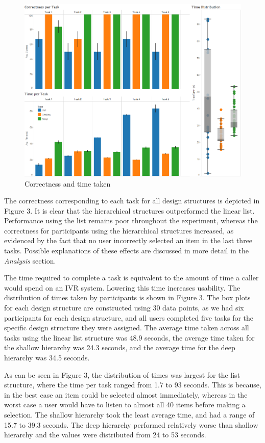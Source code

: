 \documentclass{sigchi}
\begin{document}
\begin{figure}[!h]
    \centering
    \includegraphics[width=0.9\columnwidth]{fig_CorrectnessAndTime}
    \caption{Correctness and time taken}
    \label{fig: Figure3}
\end{figure}

The correctness corresponding to each task for all design structures is depicted in Figure 3. It is clear that the hierarchical structures outperformed the linear list. Performance using the list remains poor throughout the experiment, whereas the correctness for participants using the hierarchical structures increased, as evidenced by the fact that no user incorrectly selected an item in the last three tasks. Possible explanations of these effects are discussed in more detail in the \textit{Analysis} section.

The time required to complete a task is equivalent to the amount of time a caller would spend on an IVR system. Lowering this time increases usability. The distribution of times taken by participants is shown in Figure 3. The box plots for each design structure are constructed using 30 data points, as we had six participants for each design structure, and all users completed five tasks for the specific design structure they were assigned. The average time taken across all tasks using the linear list structure was 48.9 seconds, the average time taken for the shallow hierarchy was 24.3 seconds, and the average time for the deep hierarchy was 34.5 seconds.

As can be seen in Figure 3, the distribution of times was largest for the list structure, where the time per task ranged from 1.7 to 93 seconds. This is because, in the best case an item could be selected almost immediately, whereas in the worst case a user would have to listen to almost all 40 items before making a selection. The shallow hierarchy took the least average time, and had a range of 15.7 to 39.3 seconds. The deep hierarchy performed relatively worse than shallow hierarchy and the values were distributed from 24 to 53 seconds. 
\end{document}
